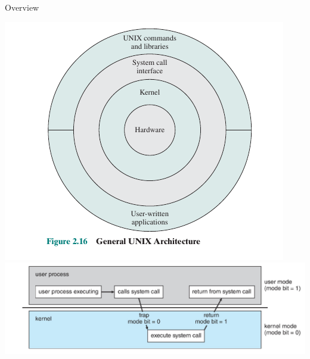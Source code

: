 \documentclass[10pt]{beamer}
\begin{document}
\begin{frame}[allowframebreaks]{Overview}
\begin{center}
   \includegraphics[keepaspectratio, width=\textwidth, height=\textheight-2\baselineskip-2\baselineskip]{img/000_rings.png} \\ \framebreak
    \includegraphics[keepaspectratio, width=\textwidth, height=\textheight-2\baselineskip-2\baselineskip]{img/000_mode_switch.png} \\ \framebreak

\end{center}
\end{frame}
\end{document}
